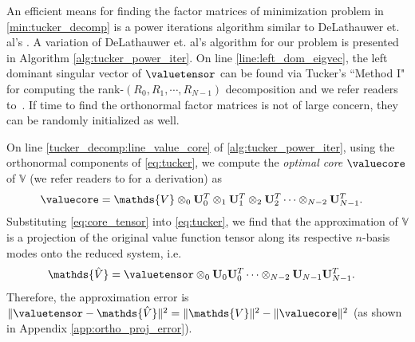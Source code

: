 An efficient means for finding the factor matrices of minimization problem in \ref{min:tucker_decomp}  is a power iterations algorithm similar to DeLathauwer et. al's \cite{DeLathauwer2000}. A variation of DeLathauwer et. al's algorithm for our problem is presented in Algorithm \autoref{alg:tucker_power_iter}. On line \autoref{line:left_dom_eigvec}, the left dominant singular vector of $\valuetensor$ can be found via Tucker's ``Method I" for computing the rank-$\left(R_0, R_1, \cdots, R_{N-1}\right)$ decomposition and we refer readers to~\cite{Tucker66}. If time to find the orthonormal factor matrices is not of large concern, they can be randomly initialized as well.

On line \autoref{tucker_decomp:line_value_core} of \autoref{alg:tucker_power_iter}, using the orthonormal components of \eqref{eq:tucker}, we compute the \textit{optimal core} $\valuecore$ of $\mathds{V}$  (we refer readers to \cite{DeLathauwer2000} for a derivation) as 
%
\begin{align}
		\valuecore  &= \mathds{V} \otimes_0 \mathbf{U}_0^T \otimes_1 \mathbf{U}_1^T \otimes_2 \mathbf{U}_2^T \cdots \otimes_{N-2} \mathbf{U}_{N-1}^T.
		\label{eq:core_tensor}
\end{align}
%
Substituting \eqref{eq:core_tensor} into \eqref{eq:tucker}, we find that the approximation of $\mathds{V}$ is  a projection of the original value function tensor along its respective $n$-basis modes onto the reduced system, i.e.
%
\begin{align}
	\mathds{\hat{V}}  &= \valuetensor \otimes_0 \mathbf{U}_0 \mathbf{U}_0^T    \cdots \otimes_{N-2} \mathbf{U}_{N-1} \mathbf{U}_{N-1}^T. 
	\label{eq:value_reduced}
\end{align}
%
Therefore, the approximation error is $\|\valuetensor - \mathds{\hat{V}}\|^2 = \|\mathds{V}\|^2 - \|\valuecore\|^2$ (as shown in Appendix \ref{app:ortho_proj_error}). 

